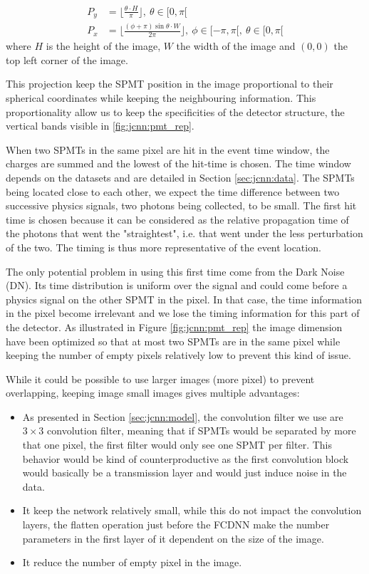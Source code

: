 \documentclass[../main.tex]{subfiles}
\begin{document}
\begin{align}
  P_y &= \bigg\lfloor \frac{\theta \cdot H}{\pi} \bigg\rfloor, ~ \theta \in [0, \pi[ \\
  P_x &= \bigg\lfloor \frac{(\phi + \pi) \sin{\theta} \cdot W}{2\pi}\bigg\rfloor, ~ \phi \in [-\pi, \pi[, ~ \theta \in [0, \pi[
\end{align}
where $H$ is the height of the image, $W$ the width of the image and $(0,0)$ the top left corner of the image.

This projection keep the SPMT position in the image proportional to their spherical coordinates while keeping the neighbouring information. This proportionality allow us to keep the specificities of the detector structure, the vertical bands visible in \ref{fig:jcnn:pmt_rep}.

When two SPMTs in the same pixel are hit in the event time window, the charges are summed and the lowest of the hit-time is chosen. The time window depends on the datasets and are detailed in Section \ref{sec:jcnn:data}. The SPMTs being located close to each other, we expect the time difference between two successive physics signals, two photons being collected, to be small. The first hit time is chosen because it can be considered as the relative propagation time of the photons that went the "straightest", i.e. that went under the less perturbation of the two. The timing is thus more representative of the event location.

The only potential problem in using this first time come from the Dark Noise (DN). Its time distribution is uniform over the signal and could come before a physics signal on the other SPMT in the pixel. In that case, the time information in the pixel become irrelevant and we lose the timing information for this part of the detector.
As illustrated in Figure \ref{fig:jcnn:pmt_rep} the image dimension have been optimized so that at most two SPMTs are in the same pixel while keeping the number of empty pixels relatively low to prevent this kind of issue.

While it could be possible to use larger images (more pixel) to prevent overlapping, keeping image small images gives multiple advantages:
\begin{itemize}
  \item As presented in Section \ref{sec:jcnn:model}, the convolution filter we use are $3 \times 3$ convolution filter, meaning that if SPMTs would be separated by more that one pixel, the first filter would only see one SPMT per filter. This behavior would be kind of counterproductive as the first convolution block would basically be a transmission layer and would just induce noise in the data.
  \item It keep the network relatively small, while this do not impact the convolution layers, the flatten operation just before the FCDNN make the number parameters in the first layer of it dependent on the size of the image.
  \item It reduce the number of empty pixel in the image.
\end{itemize}
\end{document}
